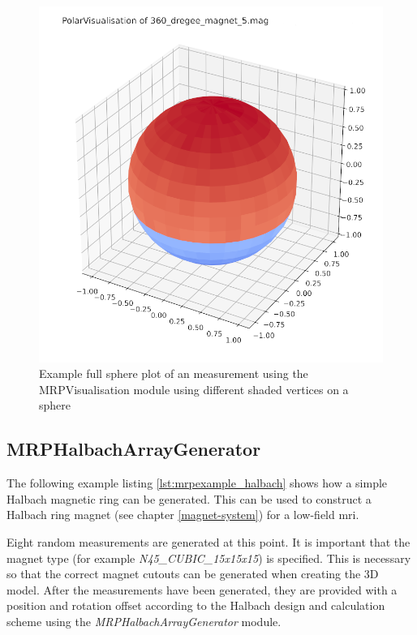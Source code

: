 \begin{figure}
\centering
\includegraphics{./generated_images/border_Example_full_sphere_plot_of_an_measurement_using_the_MRPVisualisation_module_using_different_shaded_vertices_on_a_sphere.png}
\caption{Example full sphere plot of an measurement using the
MRPVisualisation module using different shaded vertices on a sphere
\label{Example_full_sphere_plot_of_an_measurement_using_the_MRPVisualisation_module_using_different_shaded_vertices_on_a_sphere.png}}
\end{figure}

\hypertarget{mrphalbacharraygenerator}{%
\subsection{MRPHalbachArrayGenerator}\label{mrphalbacharraygenerator}}

The following example listing \ref{lst:mrpexample_halbach} shows how a
simple Halbach magnetic ring can be generated. This can be used to
construct a Halbach ring magnet (see chapter \ref{magnet-system}) for a
low-field \gls{mri}.

Eight random measurements are generated at this point. It is important
that the magnet type (for example \emph{N45\_CUBIC\_15x15x15}) is
specified. This is necessary so that the correct magnet cutouts can be
generated when creating the 3D model. After the measurements have been
generated, they are provided with a position and rotation offset
according to the Halbach design and calculation scheme 
using the \emph{MRPHalbachArrayGenerator} module.


